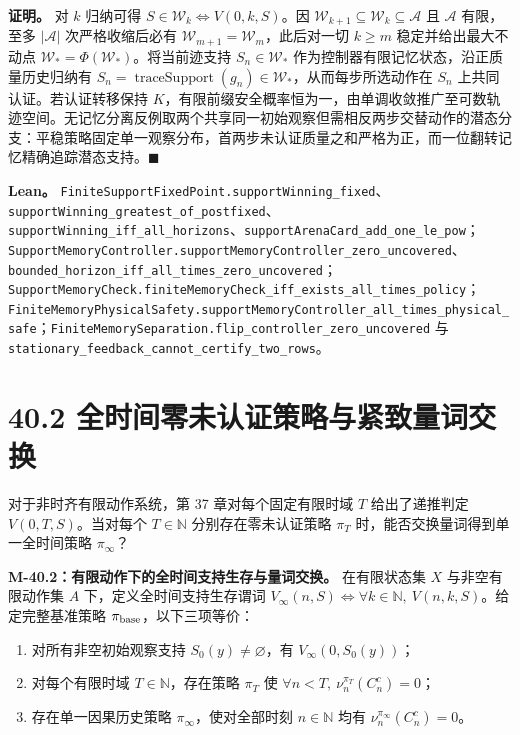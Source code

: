 \documentclass[
  11pt,
  oneside]{book}
\providecommand{\tightlist}{%
  \setlength{\itemsep}{0pt}\setlength{\parskip}{0pt}}
\begin{document}
\textbf{证明。} 对 \(k\) 归纳可得 \(S\in\mathcal W_k\iff V(0,k,S)\)。因 \(\mathcal W_{k+1}\subseteq\mathcal W_k\subseteq\mathcal A\) 且 \(\mathcal A\) 有限，至多 \(|\mathcal A|\) 次严格收缩后必有 \(\mathcal W_{m+1}=\mathcal W_m\)，此后对一切 \(k\ge m\) 稳定并给出最大不动点 \(\mathcal W_*=\Phi(\mathcal W_*)\)。将当前迹支持 \(S_n\in\mathcal W_*\) 作为控制器有限记忆状态，沿正质量历史归纳有 \(S_n=\operatorname{traceSupport}(g_n)\in\mathcal W_*\)，从而每步所选动作在 \(S_n\) 上共同认证。若认证转移保持 \(K\)，有限前缀安全概率恒为一，由单调收敛推广至可数轨迹空间。无记忆分离反例取两个共享同一初始观察但需相反两步交替动作的潜态分支：平稳策略固定单一观察分布，首两步未认证质量之和严格为正，而一位翻转记忆精确追踪潜态支持。\(\blacksquare\)

\textbf{Lean。} \nolinkurl{FiniteSupportFixedPoint.supportWinning_fixed}、\nolinkurl{supportWinning_greatest_of_postfixed}、\nolinkurl{supportWinning_iff_all_horizons}、\nolinkurl{supportArenaCard_add_one_le_pow}；\nolinkurl{SupportMemoryController.supportMemoryController_zero_uncovered}、\nolinkurl{bounded_horizon_iff_all_times_zero_uncovered}；\nolinkurl{SupportMemoryCheck.finiteMemoryCheck_iff_exists_all_times_policy}；\nolinkurl{FiniteMemoryPhysicalSafety.supportMemoryController_all_times_physical_safe}；\nolinkurl{FiniteMemorySeparation.flip_controller_zero_uncovered} 与 \nolinkurl{stationary_feedback_cannot_certify_two_rows}。

\section{40.2 全时间零未认证策略与紧致量词交换}\label{ux5168ux65f6ux95f4ux96f6ux672aux8ba4ux8bc1ux7b56ux7565ux4e0eux7d27ux81f4ux91cfux8bcdux4ea4ux6362}

对于非时齐有限动作系统，第 37 章对每个固定有限时域 \(T\) 给出了递推判定 \(V(0,T,S)\)。当对每个 \(T\in\mathbb N\) 分别存在零未认证策略 \(\pi_T\) 时，能否交换量词得到单一全时间策略 \(\pi_\infty\)？

\hypertarget{m-40-2}{}\label{m-40-2}

\textbf{M-40.2：有限动作下的全时间支持生存与量词交换。} 在有限状态集 \(X\) 与非空有限动作集 \(A\) 下，定义全时间支持生存谓词 \(V_\infty(n,S)\iff\forall k\in\mathbb N,\ V(n,k,S)\)。给定完整基准策略 \(\pi_{\rm base}\)，以下三项等价：

\begin{enumerate}
\def\labelenumi{\arabic{enumi}.}
\tightlist
\item
  对所有非空初始观察支持 \(S_0(y)\neq\varnothing\)，有 \(V_\infty(0,S_0(y))\)；
\item
  对每个有限时域 \(T\in\mathbb N\)，存在策略 \(\pi_T\) 使 \(\forall n<T,\ \nu_n^{\pi_T}(C_n^c)=0\)；
\item
  存在单一因果历史策略 \(\pi_\infty\)，使对全部时刻 \(n\in\mathbb N\) 均有 \(\nu_n^{\pi_\infty}(C_n^c)=0\)。
\end{enumerate}
\end{document}

